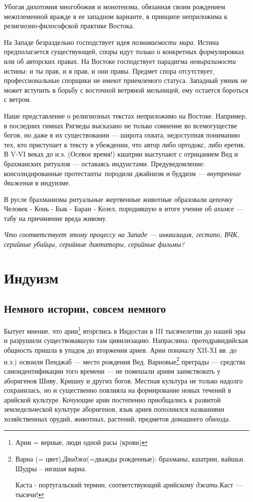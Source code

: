 Убогая дихотомия многобожия и монотеизма, обязанная своим рождением межплеменной вражде в ее западном варианте, в
принципе неприложима к религиозно-философской практике Востока.

На Западе безраздельно господствует идея \textit{познаваемости мира}. Истина предполагается существующей, споры идут
только о конкретных формулировках или об авторских правах. На Востоке господствует парадигма \textit{невыразимости}
истины: и ты прав, и я прав, и они правы. Предмет спора отсутствует, профессиональные спорщики не имеют приемлемого
статуса. Западный умник не может вступить в борьбу с восточной ветряной мельницей, ему остается бороться с ветром.

Наше представление о религиозных текстах неприложимо на Востоке. Например, в последних гимнах Ригведы высказано не
только сомнение во всемогуществе богов, но даже в их существовании — широта охвата, недоступная пониманию тех, кто
приступает к тексту в убеждении, что автор либо ортодокс, либо еретик. В
V-VI веках до н.э. (Осевое время!) кшатрии выступают с
отрицанием Вед и брахманских ритуалов — оставаясь индуистами. Предуведомление: консолидированные \flqq протестанты\frqq\ породили
джайнизм и буддизм — \textit{внутренние движения} в индуизме.

В русле брахманизма ритуальные жертвенные животные образовали цепочку Человек - Конь - Бык - Баран - Козел, породившую в
итоге учение об \textit{ахимсе }— табу на причинение вреда живому.

\textit{Что соответствует этому процессу на Западе — инквизиция, гестапо, ВЧК, серийные убийцы, серийные диктаторы, серийные фильмы?}

\section{Индуизм}
\subsection[Немного истории, совсем немного]{Немного истории, совсем немного}
Бытует мнение, что арии\footnote{Арии = верные, люди одной расы (крови)} вторглись в
Индостан в III тысячелетии до нашей эры и разрушили существовавшую там цивилизацию.
Напраслина: протодравидийская общность пришла в упадок до вторжения ариев. Арии поначалу
XII-XI вв. до н.э.) освоили Пенджаб — место рождения Вед.
Варновые\footnote{Варна (= цвет).\textit{Двиджа}(=дважды рожденные): брахманы, кшатрии, вайшьи. Шудры – низшая варна.\par
Каста - португальский термин, соответствующий арийскому
\textit{джати.}Каст — тысячи!} преграды — средства
самоидентификации того времени — не помешали ариям заимствовать у аборигенов Шиву, Кришну и других богов. Местная
культура не только надолго сохранилась, но и существенно повлияла на формирование новых течений в арийской культуре.
Кочующие арии постепенно приобщались к развитой земледельческой культуре аборигенов, язык ариев пополнился названиями
хозяйственных орудий, животных, растений, предметов домашнего обихода.

